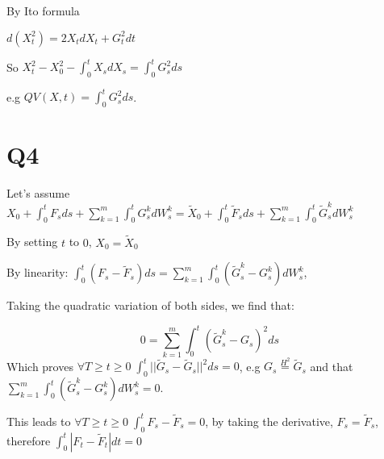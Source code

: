 \documentclass[11pt]{article}
\begin{document}
By Ito formula

\(d(X_t^2) = 2X_tdX_t + G_t^2 dt\)

So \(X_t^2 - X_0^2 - \int_0^t X_s dX_s = \int_0^t G_s^2 ds\)

e.g \(QV(X, t) = \int_0^t G_s^2 ds\).

\section{Q4}
\label{sec:orgheadline4}

Let's assume \(X_0 + \int_0^t F_s ds + \sum_{k=1}^m \int_0^t G_s^k
  dW^k_s = \tilde X_0 + \int_0^t \tilde F_s ds + \sum_{k=1}^m \int_0^t
  \tilde G_s^k dW^k_s\)

By setting \(t\) to \(0\), \(X_0 = \tilde X_0\)

By linearity: \(\int_0^t (F_s - \tilde F_s) ds = \sum_{k=1}^m \int_0^t
  (\tilde G_s^k - G_s^k) dW^k_s\),

Taking the quadratic variation of both sides, we find that:

$$0 = \sum_{k=1}^m \int_0^t (\tilde G_s^k - G_s)^2 ds$$ Which proves
\(\forall T \ge t \ge 0 \; \int_0^t ||\tilde G_s - \tilde G_s||^2 ds =
  0\), e.g \(G_s \overset{H^2}{=} \tilde G_s\) and that \(\sum_{k=1}^m
  \int_0^t (\tilde G_s^k - G_s^k) dW^k_s = 0\).

This leads to \(\forall T \ge t \ge 0 \; \int_0^t F_s - \tilde F_s =
  0\), by taking the derivative, \(F_s = \tilde F_s\), therefore
\(\int_0^t |F_t - \tilde F_t| dt = 0\)
\end{document}
